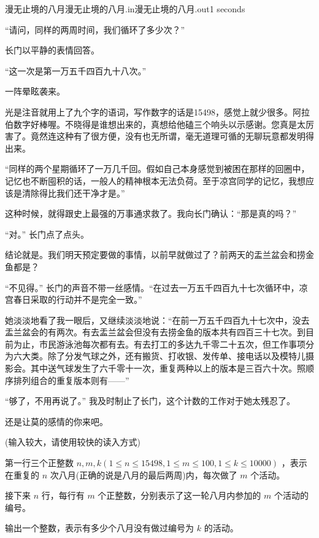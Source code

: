 \begin{problem}{漫无止境的八月}{漫无止境的八月.in}{漫无止境的八月.out}{1 seconds}


“请问，同样的两周时间，我们循环了多少次？”

长门以平静的表情回答。

“这一次是第一万五千四百九十八次。”

一阵晕眩袭来。

光是注音就用上了九个字的语词，写作数字的话是15498，感觉上就少很多。阿拉伯数字好棒喔。不晓得是谁想出来的，真想给他磕三个响头以示感谢。您真是太厉害了。竟然连这种有了很方便，没有也无所谓，毫无道理可循的无聊玩意都发明得出来。

“同样的两个星期循环了一万几千回。假如自己本身感觉到被困在那样的回圈中，记忆也不断囤积的话，一般人的精神根本无法负荷。至于凉宫同学的记忆，我想应该是清除得比我们还干净才是。”

这种时候，就得跟史上最强的万事通求救了。我向长门确认：“那是真的吗？”

“对。” 长门点了点头。

结论就是。我们明天预定要做的事情，以前早就做过了？前两天的盂兰盆会和捞金鱼都是？

“不见得。” 长门的声音不带一丝感情。“在过去一万五千四百九十七次循环中，凉宫春日采取的行动并不是完全一致。”

她淡淡地看了我一眼后，又继续淡淡地说：“在前一万五千四百九十七次中，没去盂兰盆会的有两次。有去盂兰盆会但没有去捞金鱼的版本共有四百三十七次。到目前为止，市民游泳池每次都有去。有去打工的多达九千零二十五次，但工作事项分为六大类。除了分发气球之外，还有搬货、打收银、发传单、接电话以及模特儿摄影会。其中送气球发生了六千零十一次，重复两种以上的版本是三百六十次。照顺序排列组合的重复版本则有——”

“够了，不用再说了。”  我及时制止了长门，这个计数的工作对于她太残忍了。

还是让莫的感情的你来吧。

\InputFile

(输入较大，请使用较快的读入方式)

第一行三个正整数 $n,m,k(1 \leq n \leq 15498 , 1 \leq m \leq 100 , 1 \leq k \leq 10000)$ ，表示在重复的 $n$ 次八月(正确的说是八月的最后两周)内，每次做了 $m$ 个活动。

接下来 $n$ 行，每行有 $m$ 个正整数，分别表示了这一轮八月内参加的 $m$ 个活动的编号。

\OutputFile

输出一个整数，表示有多少个八月没有做过编号为 $k$ 的活动。

\Example

\begin{example}
%
\end{example}
\end{problem}
